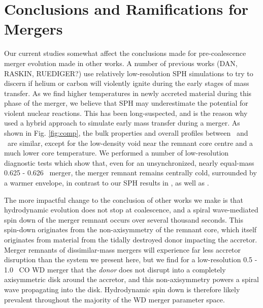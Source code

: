 \section{Conclusions and Ramifications for Mergers}
\label{sec:c3_conclusion}

Our current studies somewhat affect the conclusions made for pre-coalescence merger evolution made in other works.  A number of previous works (DAN, RASKIN, RUEDIGER?) use relatively low-resolution SPH simulations to try to discern if helium or carbon will violently ignite during the early stages of mass transfer.  As we find higher temperatures in newly accreted material during this phase of the merger, we believe that SPH may underestimate the potential for violent nuclear reactions.  This has been long-suspected, and is the reason why \cite{guil+10} used a hybrid approach to simulate early mass transfer during a merger.  As shown in Fig. \ref{fig:comp}, the bulk properties and overall profiles between \arepo\ and \gasoline\ are similar, except for the low-density void near the remnant core centre and a much lower core temperature.  We performed a number of low-resolution diagnostic tests which show that, even for an unsynchronized, nearly equal-mass 0.625 - 0.626 \Msun\ merger, the merger remnant remains centrally cold, surrounded by a warmer envelope, in contrast to our SPH results in \citeauthor{zhu+13}, as well as \citeauthor{loreig09}.

The more impactful change to the conclusion of other works we make is that hydrodynamic evolution does not stop at coalescence, and a spiral wave-mediated spin down of the merger remnant occurs over several thousand seconds.  This spin-down originates from the non-axisymmetry of the remnant core, which itself originates from material from the tidally destroyed donor impacting the accretor.  Merger remnants of dissimilar-mass mergers will experience far less accretor disruption than the system we present here, but we find for a low-resolution 0.5 - 1.0 \Msun\ CO WD merger that the \textit{donor} does not disrupt into a completely axisymmetric disk around the accretor, and this non-axisymmetry powers a spiral wave propagating into the disk.  Hydrodynamic spin down is therefore likely prevalent throughout the majority of the WD merger parameter space.

